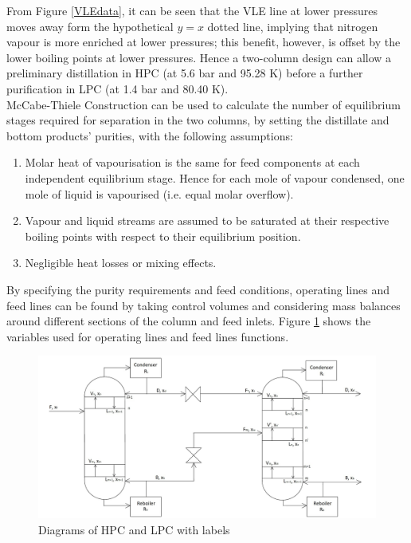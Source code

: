         \noindent From Figure \ref{VLEdata}, it can be seen that the VLE line at lower pressures moves away form the hypothetical $y=x$ dotted line, implying that nitrogen vapour is more enriched at lower pressures; this benefit, however, is offset by the lower boiling points at lower pressures. Hence a two-column design can allow a preliminary distillation in HPC (at 5.6 bar and 95.28 K) before a further purification in LPC (at 1.4 bar and 80.40 K). \\
        McCabe-Thiele Construction can be used to calculate the number of equilibrium stages required for separation in the two columns, by setting the distillate and bottom products' purities, with the following assumptions:
        \begin{enumerate}
            \item Molar heat of vapourisation is the same for feed components at each independent equilibrium stage. Hence for each mole of vapour condensed, one mole of liquid is vapourised (i.e. equal molar overflow).
            \item Vapour and liquid streams are assumed to be saturated at their respective boiling points with respect to their equilibrium position.
            \item Negligible heat losses or mixing effects.
        \end{enumerate}
        By specifying the purity requirements and feed conditions, operating lines and feed lines can be found by taking control volumes and considering mass balances around different sections of the column and feed inlets. Figure \ref{labelled_columns_diagram} shows the variables used for operating lines and feed lines functions.
        \begin{figure}[H]
            \centering
            \includegraphics[scale=0.43]{airseparation/graphics/labelled_columns_diagram.jpg}
            \caption{Diagrams of HPC and LPC with labels}
            \label{labelled_columns_diagram}
        \end{figure}
